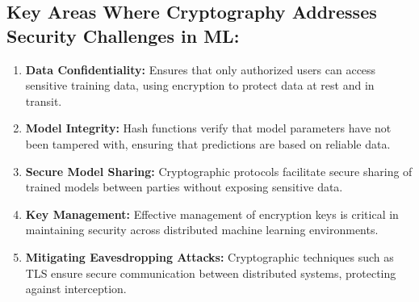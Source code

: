 \documentclass[oneside,a4paper,12pt]{report}
\begin{document}
\vspace*{1\baselineskip}
\subsection{Key Areas Where Cryptography Addresses Security Challenges in ML:}
\vspace*{1\baselineskip}
\begin{enumerate}
    \item \textbf{Data Confidentiality:} Ensures that only authorized users can access sensitive training data, using encryption to protect data at rest and in transit.
    \vspace*{1\baselineskip}
    \item \textbf{Model Integrity:} Hash functions verify that model parameters have not been tampered with, ensuring that predictions are based on reliable data.
    \vspace*{1\baselineskip}
    \item \textbf{Secure Model Sharing:} Cryptographic protocols facilitate secure sharing of trained models between parties without exposing sensitive data.
    \vspace*{1\baselineskip}
    \item \textbf{Key Management:} Effective management of encryption keys is critical in maintaining security across distributed machine learning environments.
    \vspace*{1\baselineskip}
    \item \textbf{Mitigating Eavesdropping Attacks:} Cryptographic techniques such as TLS ensure secure communication between distributed systems, protecting against interception.
\end{enumerate}

\vspace*{2\baselineskip}
\end{document}
